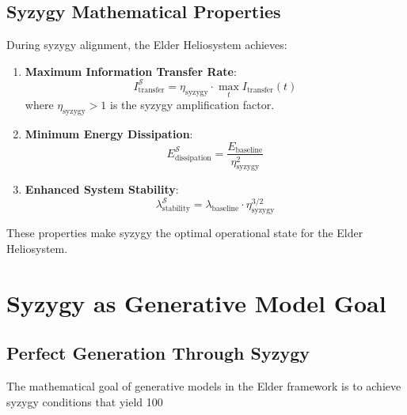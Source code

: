 \subsection{Syzygy Mathematical Properties}

\begin{theorem}
\label{thm:syzygy_optimization}
During syzygy alignment, the Elder Heliosystem achieves:

\begin{enumerate}
    \item \textbf{Maximum Information Transfer Rate}:
    \begin{equation}
    I_{\text{transfer}}^{\mathcal{S}} = \eta_{\text{syzygy}} \cdot \max_{t} I_{\text{transfer}}(t)
    \end{equation}
    where $\eta_{\text{syzygy}} > 1$ is the syzygy amplification factor.
    
    \item \textbf{Minimum Energy Dissipation}:
    \begin{equation}
    E_{\text{dissipation}}^{\mathcal{S}} = \frac{E_{\text{baseline}}}{\eta_{\text{syzygy}}^2}
    \end{equation}
    
    \item \textbf{Enhanced System Stability}:
    \begin{equation}
    \lambda_{\text{stability}}^{\mathcal{S}} = \lambda_{\text{baseline}} \cdot \eta_{\text{syzygy}}^{3/2}
    \end{equation}
\end{enumerate}

These properties make syzygy the optimal operational state for the Elder Heliosystem.
\end{theorem}

\section{Syzygy as Generative Model Goal}

\subsection{Perfect Generation Through Syzygy}

The mathematical goal of generative models in the Elder framework is to achieve syzygy conditions that yield 100%

